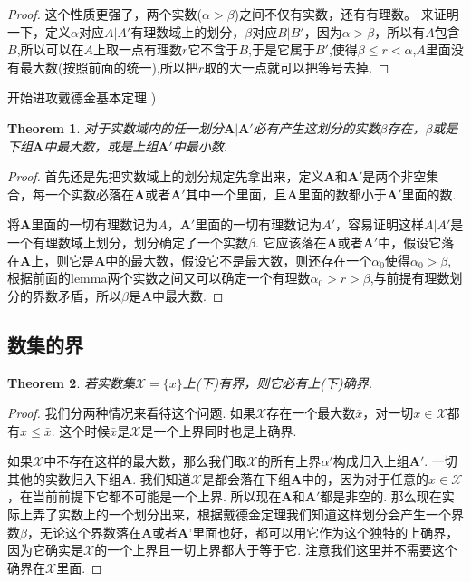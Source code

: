 \documentclass{article}
\newtheorem{theorem}{Theorem}[section]
\begin{document}
\begin{proof}
这个性质更强了，两个实数($\alpha > \beta$)之间不仅有实数，还有有理数。 来证明一下，定义$\alpha$对应$A|A'$有理数域上的划分，$\beta$对应$B|B'$，因为$\alpha > \beta$，所以有$A$包含$B$,所以可以在$A$上取一点有理数$r$它不含于$B$,于是它属于$B'$,使得$\beta \leq r<\alpha$,$A$里面没有最大数(按照前面的统一),所以把$r$取的大一点就可以把等号去掉.
\end{proof}

开始进攻{\color{red}戴德金基本定理} )

\begin{theorem}
对于实数域内的任一划分$\textbf{A}| \textbf{A}'$必有产生这划分的实数$\beta$存在，$\beta$或是下组$\textbf{A}$中最大数，或是上组$\textbf{A}'$中最小数.	
\end{theorem}

\begin{proof}
首先还是先把实数域上的划分规定先拿出来，定义$\textbf{A}$和$\textbf{A}'$是两个非空集合，每一个实数必落在$\textbf{A}$或者$\textbf{A}'$其中一个里面，且$\textbf{A}$里面的数都小于$\textbf{A}'$里面的数.

将$\textbf{A}$里面的一切有理数记为$A$，$\textbf{A}'$里面的一切有理数记为$A'$，容易证明这样$A|A'$是一个有理数域上划分，划分确定了一个实数$\beta$. 它应该落在$\textbf{A}$或者$\textbf{A}'$中，假设它落在$\textbf{A}$上，则它是$\textbf{A}$中的最大数，假设它不是最大数，则还存在一个$\alpha_0$使得$\alpha_0 > \beta$,根据前面的lemma两个实数之间又可以确定一个有理数$\alpha_0 > r > \beta$,与前提有理数划分的界数矛盾，所以$\beta$是$\textbf{A}$中最大数.
\end{proof}

\newpage
\subsection{数集的界}

\begin{theorem}
\rm 若实数集$\mathcal{X}=\{x\}$上(下)有界，则它必有上(下)确界.
\end{theorem}

\begin{proof}
我们分两种情况来看待这个问题.
如果$\mathcal{X}$存在一个最大数$\bar{x}$，对一切$x \in \mathcal{X}$都有$x \leq \bar{x}$. 这个时候$\bar{x}$是$\mathcal{X}$是一个上界同时也是上确界.

如果$\mathcal{X}$中不存在这样的最大数，那么我们取$\mathcal{X}$的所有上界$\alpha'$构成归入上组$\textbf{A}'$. 一切其他的实数归入下组$\textbf{A}$. 我们知道$\mathcal{X}$是都会落在下组$\textbf{A}$中的，因为对于任意的$x \in \mathcal{X}$，在当前前提下它都不可能是一个上界. 所以现在$\textbf{A}$和$\textbf{A}'$都是非空的. 那么现在实际上弄了实数上的一个划分出来，根据戴德金定理我们知道这样划分会产生一个界数$\beta$，无论这个界数落在$\textbf{A}$或者$\textbf{A'}$里面也好，都可以用它作为这个独特的上确界，因为它确实是$\mathcal{X}$的一个上界且一切上界都大于等于它. {\color{blue} 注意我们这里并不需要这个确界在$\mathcal{X}$里面}. 
\end{proof}
\end{document}
